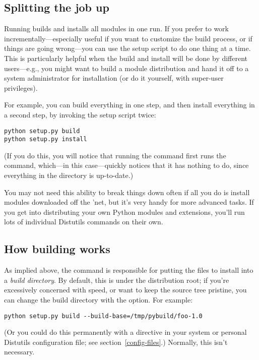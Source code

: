 \documentclass{howto}
\begin{document}
\subsection{Splitting the job up}
\label{splitting-up}

Running  builds and installs all modules in one
run.  If you prefer to work incrementally---especially useful if you
want to customize the build process, or if things are going wrong---you
can use the setup script to do one thing at a time.  This is
particularly helpful when the build and install will be done by
different users---e.g., you might want to build a module distribution
and hand it off to a system administrator for installation (or do it
yourself, with super-user privileges).

For example, you can build everything in one step, and then install
everything in a second step, by invoking the setup script twice:
\begin{verbatim}
python setup.py build
python setup.py install
\end{verbatim}
(If you do this, you will notice that running the 
command first runs the  command, which---in this
case---quickly notices that it has nothing to do, since everything in
the  directory is up-to-date.)

You may not need this ability to break things down often if all you do
is install modules downloaded off the 'net, but it's very handy for more
advanced tasks.  If you get into distributing your own Python modules
and extensions, you'll run lots of individual Distutils commands on
their own.


\subsection{How building works}
\label{how-build-works}

As implied above, the  command is responsible for putting
the files to install into a \emph{build directory}.  By default, this is
 under the distribution root; if you're excessively
concerned with speed, or want to keep the source tree pristine, you can
change the build directory with the  option.
For example:
\begin{verbatim}
python setup.py build --build-base=/tmp/pybuild/foo-1.0
\end{verbatim}
(Or you could do this permanently with a directive in your system or
personal Distutils configuration file; see
section~\ref{config-files}.)  Normally, this isn't necessary.
\end{document}
